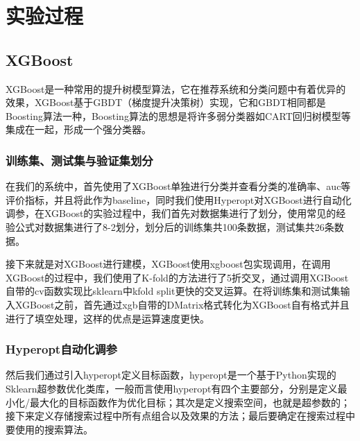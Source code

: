 %
%
%
%
%
%

\chapter{实验过程}

\section{XGBoost}

XGBoost是一种常用的提升树模型算法，它在推荐系统和分类问题中有着优异的效果，XGBoost基于GBDT（梯度提升决策树）实现，它和GBDT相同都是Boosting算法一种，Boosting算法的思想是将许多弱分类器如CART回归树模型等集成在一起，形成一个强分类器。

\subsection{训练集、测试集与验证集划分}

在我们的系统中，首先使用了XGBoost单独进行分类并查看分类的准确率、auc等评价指标，并且将此作为baseline，同时我们使用Hyperopt对XGBoost进行自动化调参，在XGBoost的实验过程中，我们首先对数据集进行了划分，使用常见的经验公式对数据集进行了8-2划分，划分后的训练集共100条数据，测试集共26条数据。

接下来就是对XGBoost进行建模，XGBoost使用xgboost包实现调用，在调用XGBoost的过程中，我们使用了K-fold的方法进行了5折交叉，通过调用XGBoost自带的cv函数实现比sklearn中kfold split更快的交叉运算。在将训练集和测试集输入XGBoost之前，首先通过xgb自带的DMatrix格式转化为XGBoost自有格式并且进行了填空处理，这样的优点是运算速度更快。

\subsection{Hyperopt自动化调参}

然后我们通过引入hyperopt定义目标函数，hyperopt是一个基于Python实现的Sklearn超参数优化类库，一般而言使用hyperopt有四个主要部分，分别是定义最小化/最大化的目标函数作为优化目标；其次是定义搜索空间，也就是超参数的；接下来定义存储搜索过程中所有点组合以及效果的方法；最后要确定在搜索过程中要使用的搜索算法。

